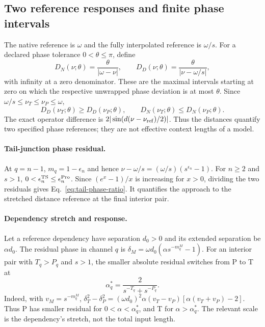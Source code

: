 \subsection{Two reference responses and finite phase intervals}
\label{sec:allocation-reference-intervals}
The native reference is $\omega$ and the fully interpolated reference is
$\omega/s$. For a declared phase tolerance $0<\theta\le\pi$, define
\begin{equation}
D_N(\nu;\theta)=\frac{\theta}{|\omega-\nu|},\qquad
D_D(\nu;\theta)=\frac{\theta}{|\nu-\omega/s|},
\label{eq:allocation-reference-distances}
\end{equation}
with infinity at a zero denominator. These are the maximal intervals
starting at zero on which the respective unwrapped phase deviation is at
most $\theta$. Since $\omega/s\le\nu_T\le\nu_P\le\omega$,
\begin{equation}
D_D(\nu_T;\theta)\ge D_D(\nu_P;\theta),\qquad
D_N(\nu_T;\theta)\le D_N(\nu_P;\theta).
\label{eq:allocation-reference-order}
\end{equation}
The exact operator difference is
$2|\sin(d(\nu-\nu_{\rm ref})/2)|$.
Thus the distances quantify two specified phase references; they are not
effective context lengths of a model.

\paragraph{Tail-junction phase residual.}
At $q=n-1$, $m_q=1-\epsilon_n$ and hence
$\nu-\omega/s=(\omega/s)(s^{\epsilon_n}-1)$. For $n\ge2$ and $s>1$,
$0<\epsilon_n^{\rm TS}\le\epsilon_n^{\rm Pro}$. Since
$(e^x-1)/x$ is increasing for $x>0$, dividing the two residuals gives
Eq.~\eqref{eq:tail-phase-ratio}. It quantifies the approach to the stretched
distance reference at the final interior pair.

\paragraph{Dependency stretch and response.}
Let a reference dependency have separation $d_0>0$ and its extended separation
be $\alpha d_0$. The residual phase in channel $q$ is
$\delta_M=\omega d_0(\alpha s^{-m_q^M}-1)$. For an interior pair with
$T_q>P_q$ and $s>1$, the smaller absolute residual switches from P to T at
\begin{equation}
\alpha_q^*=\frac{2}{s^{-T_q}+s^{-P_q}}.
\label{eq:dependency-crossover}
\end{equation}
Indeed, with $v_M=s^{-m_q^M}$,
$\delta_T^2-\delta_P^2=(\omega d_0)^2\alpha(v_T-v_P)
[\alpha(v_T+v_P)-2]$. Thus P has smaller residual for
$0<\alpha<\alpha_q^*$, and T for $\alpha>\alpha_q^*$.
The relevant scale is the dependency's stretch, not the total input length.

